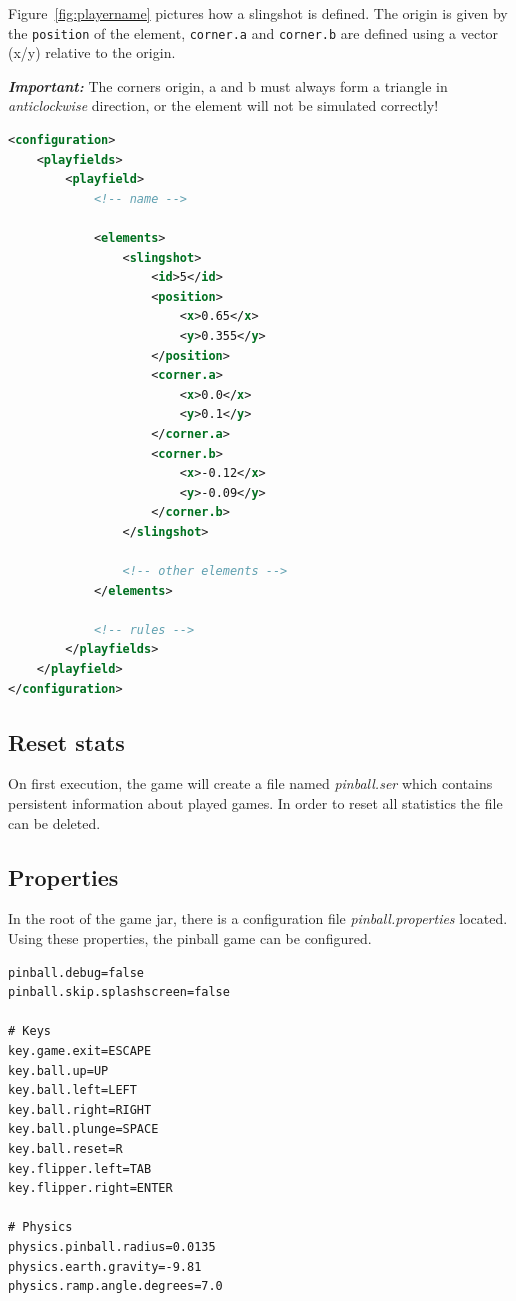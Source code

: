 \documentclass[fontsize=12pt,
               paper=a4,
               twoside=false,
               parskip=half,
               ]{scrartcl}
\begin{document}
Figure~\ref{fig:playername} pictures how a slingshot is defined. The origin is given by the \texttt{position} of the element, \texttt{corner.a} and \texttt{corner.b} are defined using a vector (x/y) relative to the origin.

\textbf{\textsl{Important:}} The corners origin, a and b must always form a triangle in \textsl{anticlockwise} direction, or the element will not be simulated correctly!

\begin{lstlisting}[language=xml,label=lst:bumper,caption={bumper}]
<configuration>
	<playfields>
		<playfield>
			<!-- name -->
			
			<elements>
				<slingshot>
					<id>5</id>
					<position>
						<x>0.65</x>
						<y>0.355</y>
					</position>
					<corner.a>
						<x>0.0</x>
						<y>0.1</y>
					</corner.a>
					<corner.b>
						<x>-0.12</x>
						<y>-0.09</y>
					</corner.b>
				</slingshot>
				
				<!-- other elements -->
			</elements>
			
			<!-- rules -->
		</playfields>
	</playfield>
</configuration>
\end{lstlisting}

\subsection{Reset stats}

On first execution, the game will create a file named \emph{pinball.ser} which contains persistent information about played games. In order to reset all statistics the file can be deleted.

\subsection{Properties}

In the root of the game jar, there is a configuration file \emph{pinball.properties} located. Using these properties, the pinball game can be configured.

\begin{lstlisting}[label=lst:properties,caption={pinball.properties}]
pinball.debug=false
pinball.skip.splashscreen=false

# Keys
key.game.exit=ESCAPE
key.ball.up=UP
key.ball.left=LEFT
key.ball.right=RIGHT
key.ball.plunge=SPACE
key.ball.reset=R
key.flipper.left=TAB
key.flipper.right=ENTER

# Physics
physics.pinball.radius=0.0135
physics.earth.gravity=-9.81
physics.ramp.angle.degrees=7.0
\end{lstlisting}
\end{document}
